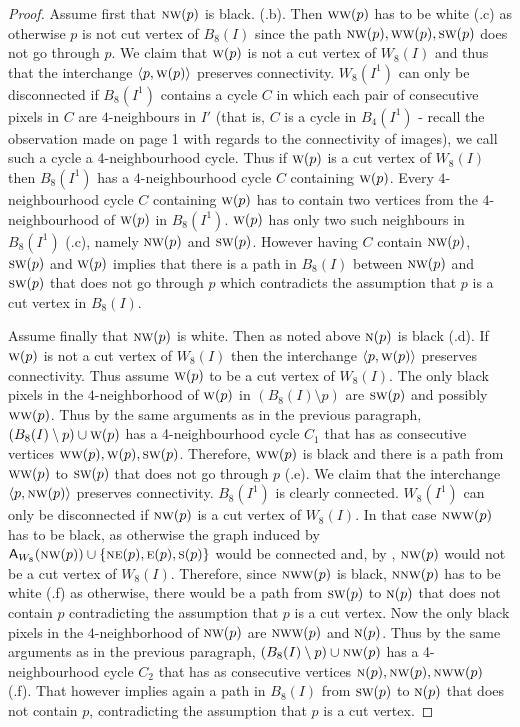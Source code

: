 \documentclass[lotsofwhite,charterfonts]{patmorin}
\newcommand{\N}{\textsc{n}}
\newcommand{\NE}{\textsc{ne}}
\newcommand{\E}{\textsc{e}}
\renewcommand{\S}{\textsc{s}}
\newcommand{\SW}{\textsc{sw}}
\newcommand{\W}{\textsc{w}}
\newcommand{\NW}{\textsc{nw}}
\newcommand{\ic}[2]{\langle #1,#2 \rangle}
\newcommand{\A}[2]{\ensuremath{\protect\textup{\textsf{A}}_{#2}(#1)}}
\newcommand{\sm}{\ensuremath{\setminus}}
\begin{document}
\begin{proof}
Assume first that $\NW(p)$ is black. (.b). Then $\W\W(p)$ has to be white (.c) as otherwise $p$ is not cut vertex of $B_8(I)$ since the path $\NW(p),\W\W(p) , \SW(p)$ does not go through $p$. We claim that $\W(p)$ is not a cut vertex of $W_8(I)$ and thus that the interchange $\ic{p}{\W(p)}$ preserves connectivity.  $W_8(I^1)$ can only be disconnected if $B_8(I^1)$ contains a cycle $C$ in which each pair of consecutive pixels in $C$ are $4$-neighbours in $I'$ (that is, $C$ is a cycle in $B_4(I^1)$ - recall the observation made on page 1 with regards to the connectivity of images), we call such a cycle a $4$-neighbourhood cycle. Thus if  $\W(p)$ is a cut vertex of $W_8(I)$ then $B_8(I^1)$ has a  $4$-neighbourhood cycle $C$ containing  $\W(p)$. Every $4$-neighbourhood cycle $C$ containing  $\W(p)$ has to contain two vertices from the $4$-neighbourhood of $\W(p)$ in $B_8(I^1)$. $\W(p)$ has only two such neighbours in $B_8(I^1)$ (.c), namely $\NW(p)$ and $\SW(p)$. However having $C$ contain  $\NW(p)$, $\SW(p)$ and $\W(p)$ implies that there is a path in $B_8(I)$ between $\NW(p)$  and $\SW(p)$ that does not go through $p$ which contradicts the assumption that $p$ is a cut vertex in $B_8(I)$.

Assume finally that $\NW(p)$ is white. Then as noted above $\N(p)$ is black (.d). If $\W(p)$ is not a cut vertex of $W_8(I)$ then  the interchange $\ic{p}{\W(p)}$ preserves connectivity. Thus assume $\W(p)$ to be a cut vertex of $W_8(I)$. The only black pixels in the $4$-neighborhood of $\W(p)$ in $(B_8(I)\sm p)$ are $\SW(p)$ and possibly $\W\W(p)$. Thus by the same arguments as in the previous paragraph, $(B_8(I)\sm p)\cup \W(p) $ has a 4-neighbourhood cycle $C_1$ that has  as consecutive vertices $\W\W(p), \W(p), \SW(p)$. Therefore, $\W\W(p)$ is black and there is a path from $\W\W(p)$ to $\SW(p)$ that does not go through $p$ (.e). We claim that the interchange $\ic{p}{\NW(p)}$ preserves connectivity. $B_8(I^1)$ is clearly connected. $W_8(I^1)$ can only be disconnected if $\NW(p)$ is a cut vertex of $W_8(I)$. In that case $\NW\W(p)$ has to be black, as otherwise the graph induced by $\A{\NW(p)}{W_8}\cup \{\NE(p), \E(p), \S(p)\}$ would be connected and, by , $\NW(p)$ would not be a cut vertex of $W_8(I)$. Therefore, since $\NW\W(p)$ is black, $\N\NW(p)$ has to be  white (.f) as otherwise, there would be a path from $\SW(p)$ to $\N(p)$  that does not contain $p$ contradicting the assumption that $p$ is a cut vertex.  Now the only black pixels in the $4$-neighborhood of $\NW(p)$ are $\NW\W(p)$ and  $\N(p)$. Thus by the same arguments as in the  previous paragraph, $(B_8(I)\sm p)\cup \NW(p) $ has a 4-neighbourhood cycle $C_2$ that has as consecutive vertices $\N(p), \NW(p), \N\W\W(p)$ (.f). That however implies again a path in $B_8(I)$ from $\SW(p)$ to $\N(p)$ that does not contain $p$, contradicting the assumption that $p$ is a cut vertex. 
\end{proof}
\end{document}
